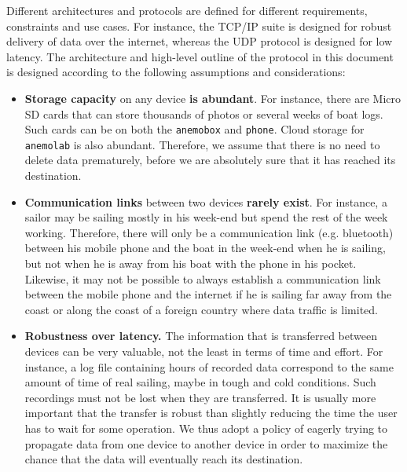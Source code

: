 \documentclass{article}
\newcommand{\device}[1]{\texttt{#1}}
\newcommand{\anemobox}{\device{anemobox}}
\newcommand{\phone}{\device{phone}}
\newcommand{\anemolab}{\texttt{anemolab}}
\begin{document}
Different architectures and protocols are defined for different requirements, constraints and use cases. For instance, the TCP/IP suite is designed for robust delivery of data over the internet, whereas the UDP protocol is designed for low latency. The architecture and high-level outline of the protocol in this document is designed according to the following assumptions and considerations:
\begin{itemize}
  \item \textbf{Storage capacity} on any device \textbf{is abundant}. For instance, there are Micro SD cards that can store thousands of photos or several weeks of boat logs. Such cards can be on both the \anemobox{} and \phone{}. Cloud storage for \anemolab{} is also abundant. Therefore, we assume that there is no need to delete data prematurely, before we are absolutely sure that it has reached its destination.
  \item \textbf{Communication links} between two devices \textbf{rarely exist}. For instance, a sailor may be sailing mostly in his week-end but spend the rest of the week working. Therefore, there will only be a communication link (e.g. bluetooth) between his mobile phone and the boat in the week-end when he is sailing, but not when he is away from his boat with the phone in his pocket. Likewise, it may not be possible to always establish a communication link between the mobile phone and the internet if he is sailing far away from the coast or along the coast of a foreign country where data traffic is limited. 
  \item \textbf{Robustness over latency.} The information that is transferred between devices can be very valuable, not the least in terms of time and effort. For instance, a log file containing hours of recorded data correspond to the same amount of time of real sailing, maybe in tough and cold conditions. Such recordings must not be lost when they are transferred. It is usually more important that the transfer is robust than slightly reducing the time the user has to wait for some operation. We thus adopt a policy of eagerly trying to propagate data from one device to another device in order to maximize the chance that the data will eventually reach its destination.
\end{itemize}
\end{document}
